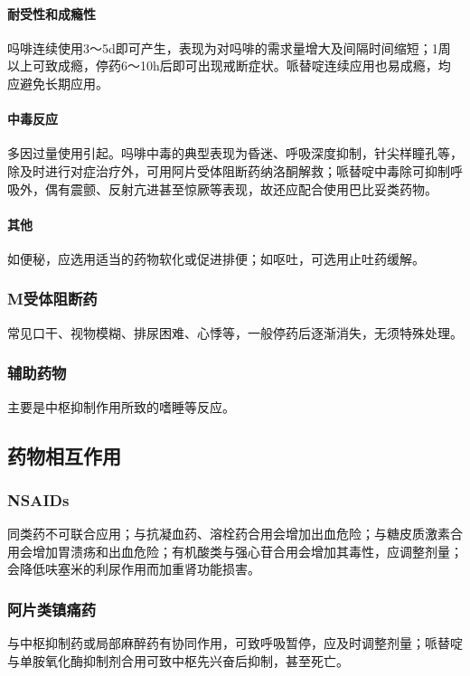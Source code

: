 \paragraph{耐受性和成瘾性}

吗啡连续使用3～5d即可产生，表现为对吗啡的需求量增大及间隔时间缩短；1周以上可致成瘾，停药6～10h后即可出现戒断症状。哌替啶连续应用也易成瘾，均应避免长期应用。
\paragraph{中毒反应}

多因过量使用引起。吗啡中毒的典型表现为昏迷、呼吸深度抑制，针尖样瞳孔等，除及时进行对症治疗外，可用阿片受体阻断药纳洛酮解救；哌替啶中毒除可抑制呼吸外，偶有震颤、反射亢进甚至惊厥等表现，故还应配合使用巴比妥类药物。
\paragraph{其他}

如便秘，应选用适当的药物软化或促进排便；如呕吐，可选用止吐药缓解。

\subsubsection{M受体阻断药}

常见口干、视物模糊、排尿困难、心悸等，一般停药后逐渐消失，无须特殊处理。

\subsubsection{辅助药物}

主要是中枢抑制作用所致的嗜睡等反应。

\subsection{药物相互作用}

\subsubsection{NSAIDs}

同类药不可联合应用；与抗凝血药、溶栓药合用会增加出血危险；与糖皮质激素合用会增加胃溃疡和出血危险；有机酸类与强心苷合用会增加其毒性，应调整剂量；会降低呋塞米的利尿作用而加重肾功能损害。

\subsubsection{阿片类镇痛药}

与中枢抑制药或局部麻醉药有协同作用，可致呼吸暂停，应及时调整剂量；哌替啶与单胺氧化酶抑制剂合用可致中枢先兴奋后抑制，甚至死亡。